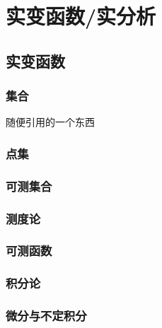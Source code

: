 \documentclass[12pt, a4paper, oneside, UTF8]{ctexbook}
\begin{document}
\else
\fi
\part{实变函数/实分析}
\chapter{实变函数}
\section{集合}
随便引用的一个东西\cite{choy20194d}

\section{点集}

\section{可测集合}

\section{测度论}

\section{可测函数}

\section{积分论}

\section{微分与不定积分}

\ifx\allfiles\undefined
\end{document}
